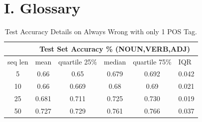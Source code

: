 \documentclass[12pt]{article}
\begin{document}
\section*{I. Glossary}
\begin{table}[!h]
\begin{tabular}{c|ccccc|}
\cline{2-6}
\multicolumn{1}{l|}{}         & \multicolumn{5}{c|}{Test Set Accuracy \% (NOUN,VERB,ADJ)}                                                                                                     \\ \hline
\multicolumn{1}{|c|}{seq len} & \multicolumn{1}{c|}{mean}  & \multicolumn{1}{c|}{quartile 25\%} & \multicolumn{1}{l|}{median} & \multicolumn{1}{l|}{quartile 75\%} & \multicolumn{1}{l|}{IQR} \\ \hline
\multicolumn{1}{|c|}{5}       & \multicolumn{1}{c|}{0.66}  & \multicolumn{1}{c|}{0.65}          & \multicolumn{1}{c|}{0.679}  & \multicolumn{1}{c|}{0.692}         & 0.042                    \\ \hline
\multicolumn{1}{|c|}{10}      & \multicolumn{1}{c|}{0.66}  & \multicolumn{1}{c|}{0.669}         & \multicolumn{1}{c|}{0.68}   & \multicolumn{1}{c|}{0.69}          & 0.021                    \\ \hline
\multicolumn{1}{|c|}{25}      & \multicolumn{1}{c|}{0.681} & \multicolumn{1}{c|}{0.711}         & \multicolumn{1}{c|}{0.725}  & \multicolumn{1}{c|}{0.730}         & 0.019                    \\ \hline
\multicolumn{1}{|c|}{50}      & \multicolumn{1}{c|}{0.727} & \multicolumn{1}{c|}{0.729}         & \multicolumn{1}{c|}{0.761}  & \multicolumn{1}{c|}{0.766}         & 0.037                    \\ \hline
\end{tabular}
\caption{Test Accuracy Details on Always Wrong with only 1 POS Tag.}
\label{appendix:alwayswrongonly1}
\end{table}
\end{document}
